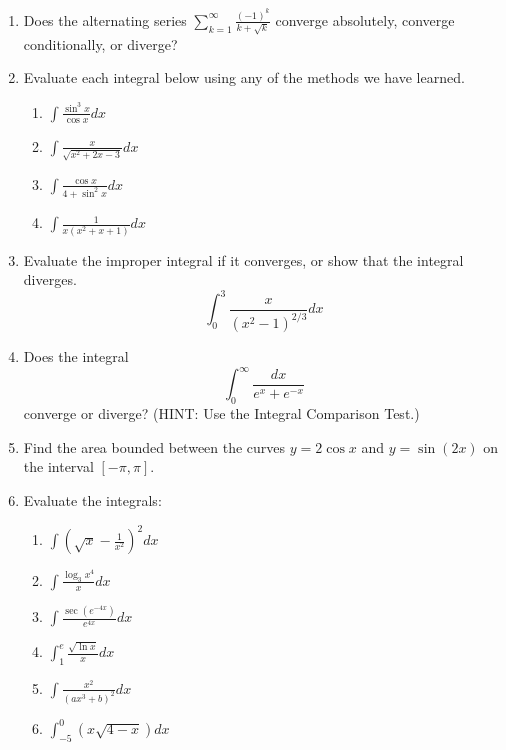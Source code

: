 \documentclass[12pt]{article}
\begin{document}
\begin{enumerate}
\item 
Does the alternating series $\sum_{k=1}^{\infty} 
{\frac{(-1)^k}{k + \sqrt{k}}}$ converge absolutely, converge 
conditionally, or diverge?
\medskip

\item 
Evaluate each integral below using any of the methods we have 
learned.
\begin{enumerate}
\item $\int {\frac{\sin^3 x}{\cos x}} dx$
\medskip
\item $\int {\frac{x}{\sqrt{x^2+2x-3}}} dx$
\medskip
\item $\int {\frac{\cos x}{4+ \sin^2 x}} dx$
\medskip
\item $\int {\frac{1}{x (x^2+x+1)}} dx$
\medskip
\end{enumerate}

\item Evaluate the improper integral if it converges, or show 
that the integral diverges.
$$\int_0^3 {\frac{x}{(x^2-1)^{2/3}}} dx$$
\medskip

\item 
Does the integral
$$\int_0^{\infty} {\frac{dx}{e^x + e^{-x}}}$$
converge or diverge?  (HINT: Use the Integral Comparison Test.)
\medskip

\item 
Find the area bounded between the curves
$y=2 \cos x$ and $y=\sin (2x)$ on the interval $[-\pi,\pi]$.
\vfil\eject

\item 
Evaluate the integrals:

\begin{enumerate}

\item $\int \left ( \sqrt{x} - {\frac{1}{x^2}} \right )^2 dx$
\medskip

\item $\int {\frac{\log_3 x^4}{x}} dx$
\medskip

\item $\int {\frac{\sec (e^{-4x})}{e^{4x}}} dx$
\medskip

\item $\int_1^e {\frac{\sqrt{\ln x}}{x}} dx$
\medskip

\item $\int {\frac{x^2}{(ax^3+b)^2}}dx$
\medskip

\item $\int_{-5}^{0} \left ( x \sqrt{4-x} \right ) dx$
\medskip

\end{enumerate}



\end{enumerate}
\end{document}
